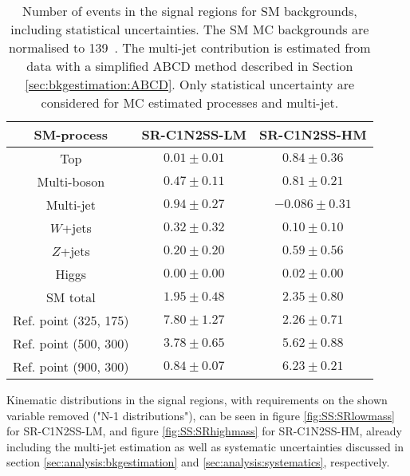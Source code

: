 \begin{table}
\centering

\begin{tabular}{c|c|c}
\hline
SM-process & SR-C1N2SS-LM & SR-C1N2SS-HM\tabularnewline
\hline
\hline
Top & $0.01\pm0.01$ & $0.84\pm0.36$\tabularnewline
Multi-boson & $0.47\pm0.11$ & $0.81\pm0.21$\tabularnewline
Multi-jet & $0.94\pm0.27$ & $ -0.086 \pm 0.31$\tabularnewline
$W$+jets & $0.32\pm0.32$ & $0.10\pm0.10$\tabularnewline
$Z$+jets & $0.20\pm0.20$ & $0.59\pm0.56$\tabularnewline
Higgs & $0.00\pm0.00$ & $0.02\pm0.00$\tabularnewline
\hline
SM total & $1.95 \pm 0.48$ & $2.35\pm0.80$\tabularnewline
\hline
Ref. point (325, 175) & $ 7.80 \pm 1.27 $& $ 2.26 \pm 0.71 $\tabularnewline
Ref. point (500, 300)  & $ 3.78 \pm 0.65 $& $ 5.62 \pm 0.88 $\tabularnewline
Ref. point (900, 300) &  $ 0.84 \pm 0.07 $ & $ 6.23 \pm 0.21 $\tabularnewline
\hline
\end{tabular}
\caption{Number of events in the signal regions for SM backgrounds, including statistical
  uncertainties.  The SM MC backgrounds are normalised to 139~\ifb. The multi-jet contribution is estimated
  from data with a simplified ABCD method described in Section
  \ref{sec:bkgestimation:ABCD}. Only statistical uncertainty are considered for MC
  estimated processes and multi-jet.
\label{tab:SS:SRyields}}
\end{table}


Kinematic distributions in the signal regions, with requirements on the shown variable removed ("N-1 distributions"), can be seen in figure \ref{fig:SS:SRlowmass} for SR-C1N2SS-LM,  and figure \ref{fig:SS:SRhighmass} for SR-C1N2SS-HM,  already including the multi-jet estimation as well as systematic uncertainties discussed in section \ref{sec:analysis:bkgestimation} and \ref{sec:analysis:systematics}, respectively. 

